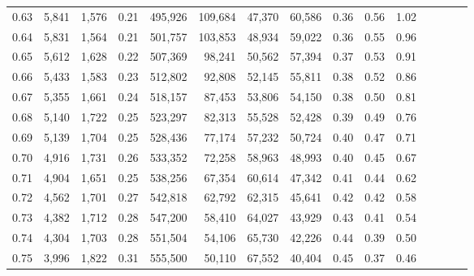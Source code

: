 \begin{tabular}{rrrcrrrrrrrrrrr}
0.63 &  5,841 &  1,576 &                                       0.21 &  495,926 &  109,684 &   47,370 &   60,586 &  0.36 &  0.56 &                         1.02 \\
0.64 &  5,831 &  1,564 &                                       0.21 &  501,757 &  103,853 &   48,934 &   59,022 &  0.36 &  0.55 &                         0.96 \\
0.65 &  5,612 &  1,628 &                                       0.22 &  507,369 &   98,241 &   50,562 &   57,394 &  0.37 &  0.53 &                         0.91 \\
0.66 &  5,433 &  1,583 &                                       0.23 &  512,802 &   92,808 &   52,145 &   55,811 &  0.38 &  0.52 &                         0.86 \\
0.67 &  5,355 &  1,661 &                                       0.24 &  518,157 &   87,453 &   53,806 &   54,150 &  0.38 &  0.50 &                         0.81 \\
0.68 &  5,140 &  1,722 &                                       0.25 &  523,297 &   82,313 &   55,528 &   52,428 &  0.39 &  0.49 &                         0.76 \\
0.69 &  5,139 &  1,704 &                                       0.25 &  528,436 &   77,174 &   57,232 &   50,724 &  0.40 &  0.47 &                         0.71 \\
0.70 &  4,916 &  1,731 &                                       0.26 &  533,352 &   72,258 &   58,963 &   48,993 &  0.40 &  0.45 &                         0.67 \\
0.71 &  4,904 &  1,651 &                                       0.25 &  538,256 &   67,354 &   60,614 &   47,342 &  0.41 &  0.44 &                         0.62 \\
0.72 &  4,562 &  1,701 &                                       0.27 &  542,818 &   62,792 &   62,315 &   45,641 &  0.42 &  0.42 &                         0.58 \\
0.73 &  4,382 &  1,712 &                                       0.28 &  547,200 &   58,410 &   64,027 &   43,929 &  0.43 &  0.41 &                         0.54 \\
0.74 &  4,304 &  1,703 &                                       0.28 &  551,504 &   54,106 &   65,730 &   42,226 &  0.44 &  0.39 &                         0.50 \\
0.75 &  3,996 &  1,822 &                                       0.31 &  555,500 &   50,110 &   67,552 &   40,404 &  0.45 &  0.37 &                         0.46 \\

\end{tabular}
